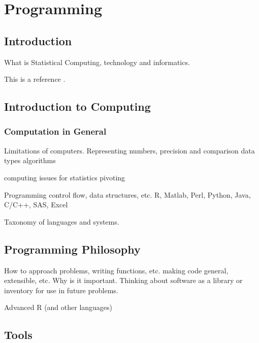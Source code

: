 \documentclass{book}
\begin{document}
\begin{comment}
This is the  basic and initial outline
of topics we discussed on Saturday, 26th of June.
It is not in any way fixed.
\end{comment}

\tableofcontents




\part{Programming}

\chapter{Introduction}
What is Statistical Computing, technology and informatics.

This is a reference \cite{GreenBook}.

\chapter{Introduction to Computing}
\section{Computation in General}
  Limitations of computers.
  Representing numbers,
  precision and comparison
  data types
  algorithms

  computing issues for statistics
    pivoting

   
  Programming
    control flow, data structures, etc.
    R, Matlab, Perl, Python, Java, C/C++, SAS, Excel

  Taxonomy of languages and systems.

\chapter{Programming Philosophy}

How to approach problems, writing functions, etc.  making code
general, extensible, etc.  Why is it important.  Thinking about
software as a library or inventory for use in future problems.

Advanced R (and other languages)



\chapter{Tools}
\end{document}
